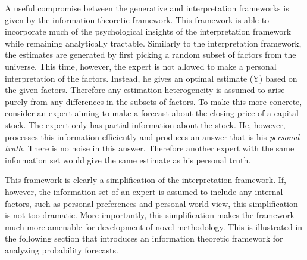 \documentclass[11pt,twoside]{article}
\begin{document}
A useful compromise between the generative and interpretation frameworks is given by the information theoretic framework. This framework is able to incorporate much of the psychological insights of the interpretation framework while remaining analytically tractable. Similarly to the interpretation framework, the estimates are generated by first picking a random subset of factors from the universe. This time, however, the expert is not allowed to make a personal interpretation of the factors. Instead, he gives an optimal estimate (Y) based on the given factors.  Therefore any estimation heterogeneity is assumed to arise purely from any differences in the subsets of factors. To make this more concrete, consider an expert aiming to make a forecast  about the closing price of a capital stock. The expert only has partial information about the stock. He, however, processes this information efficiently and produces an answer that is his \textit{personal truth}. There is no noise in this answer. Therefore another expert with the same information set would give the same estimate as his personal truth.

This framework is clearly a simplification of the interpretation framework. If, however, the information set of an expert is assumed to include any internal factors, such as personal preferences and personal world-view, this simplification is not too dramatic. More importantly, this simplification makes the framework much more amenable for development of novel methodology. This is illustrated in the following section that introduces an information theoretic framework for analyzing probability forecasts.


\end{document}
